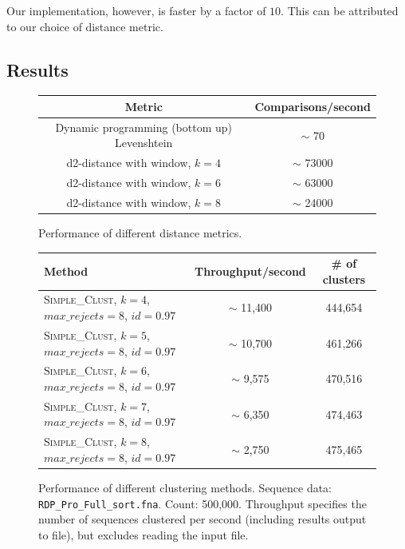 Our implementation, however, is faster by a factor of $10$. This can be 
attributed to our choice of distance metric.
\\


\subsection{Results}
\begin{figure}[H]
  \centering
  \begin{tabular}{ c | c }
    Metric                                        & Comparisons/second      \\
    \hline \hline
    Dynamic programming (bottom up) Levenshtein   & $\sim$ 70               \\
    \hline
    d2-distance with window, $k=4$                & $\sim$ 73000            \\
    \hline
    d2-distance with window, $k=6$                & $\sim$ 63000            \\
    \hline
    d2-distance with window, $k=8$                & $\sim$ 24000            \\
  \end{tabular}
  \caption{Performance of different distance metrics.}
\end{figure}

\begin{figure}[H]
  \centering
  \begin{tabular}{ p{12em} | c | c }
    Method  & Throughput/second   & \# of clusters \\
    \hline \hline
    \textsc{Simple\_Clust}, $k=4$,
    $max\_rejects=8$, $id=0.97$     & $\sim$ 11,400  & 444,654  \\
    \hline
    \textsc{Simple\_Clust}, $k=5$,
    $max\_rejects=8$, $id=0.97$     & $\sim$ 10,700  & 461,266  \\
    \hline
    \textsc{Simple\_Clust}, $k=6$,
    $max\_rejects=8$, $id=0.97$     & $\sim$ 9,575   & 470,516  \\
    \hline
    \textsc{Simple\_Clust}, $k=7$,
    $max\_rejects=8$, $id=0.97$     & $\sim$ 6,350   & 474,463  \\
    \hline
    \textsc{Simple\_Clust}, $k=8$,
    $max\_rejects=8$, $id=0.97$     & $\sim$ 2,750   & 475,465  \\
  \end{tabular}
  \caption{Performance of different clustering methods. Sequence data:
           \texttt{RDP\_Pro\_Full\_sort.fna}. Count: 500,000. Throughput
           specifies the number of sequences clustered per second (including
           results output to file), but excludes reading the input file.}
\end{figure}
